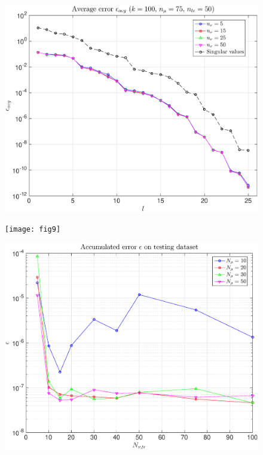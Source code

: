 \documentclass[11pt,a4paper]{article}
\theoremstyle{definition}
\theoremstyle{theorem}
\numberwithin{equation}{section}
\begin{document}
	\begin{figure}[H]
		\center
		\includegraphics[scale = 0.5]{fig8}
		\caption{}
	\end{figure}
	
	\begin{figure}[H]
		\center
		\texttt{[image: fig9]}
		\caption{}
	\end{figure}
	
	\begin{figure}[H]
		\center
		\includegraphics[scale = 0.5]{fig10}
		\caption{}
	\end{figure}
	
\end{document}
